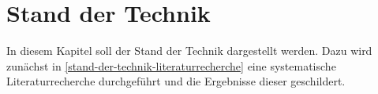 \chapter{Stand der Technik} \label{stand-der-technik}

In diesem Kapitel soll der Stand der Technik dargestellt werden. Dazu wird zunächst in \autoref{stand-der-technik-literaturrecherche} eine systematische Literaturrecherche durchgeführt und die Ergebnisse dieser geschildert.

